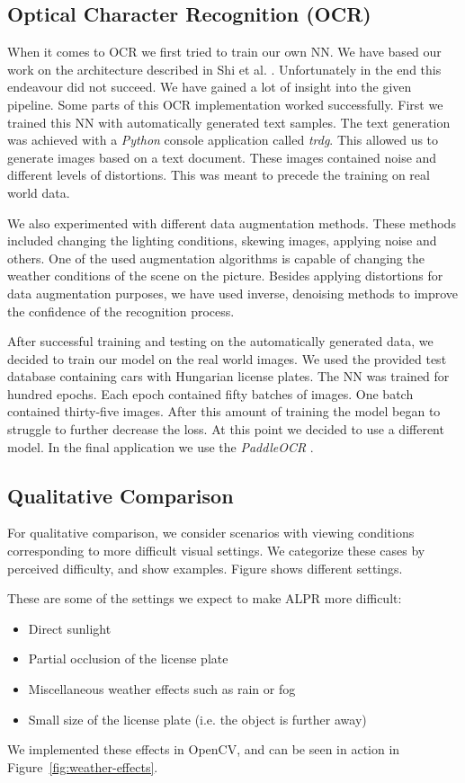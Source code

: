 \subsection{Optical Character Recognition (OCR)}

When it comes to \ac{OCR} we first tried to train our own \ac{NN}.  We have
based our work on the architecture described in Shi et al. \cite{7801919}.
Unfortunately in the end this endeavour did not succeed.  We have gained a lot
of insight into the given pipeline.  Some parts of this \ac{OCR} implementation
worked successfully.  First we trained this \ac{NN} with automatically generated
text samples.  The text generation was achieved with a \emph{Python} console
application called \emph{trdg}.  This allowed us to generate images based on
a text document.  These images contained noise and different levels of
distortions.  This was meant to precede the training on real world data.

We also experimented with different data augmentation methods.  These methods
included changing the lighting conditions, skewing images, applying noise and
others.  One of the used augmentation algorithms is capable of changing the
weather conditions of the scene on the picture.  Besides applying distortions
for data augmentation purposes, we have used inverse, denoising methods to
improve the confidence of the recognition process.

After successful training and testing on the automatically generated data, we
decided to train our model on the real world images.  We used the provided test
database containing cars with Hungarian license plates.  The \ac{NN} was trained
for hundred epochs.  Each epoch contained fifty batches of images.  One batch
contained thirty-five images.  After this amount of training the model began to
struggle to further decrease the loss.  At this point we decided to use
a different model.  In the final application we use the \emph{PaddleOCR}
\cite{DBLP:journals/corr/abs-2009-09941}.

\subsection{Qualitative Comparison}
For qualitative comparison, we consider scenarios with viewing conditions
corresponding to more difficult visual settings. We categorize these cases by
perceived difficulty, and show examples. Figure  shows
different settings. 

These are some of the settings we expect to make \ac{ALPR} more
difficult:
\begin{itemize}
    \item Direct sunlight 
    \item Partial occlusion of the license plate 
    \item Miscellaneous weather effects such as rain or fog
    \item Small size of the license plate (i.e. the object is further away)
\end{itemize}

We implemented these effects in OpenCV, and can be seen in action in
Figure~\ref{fig:weather-effects}.
